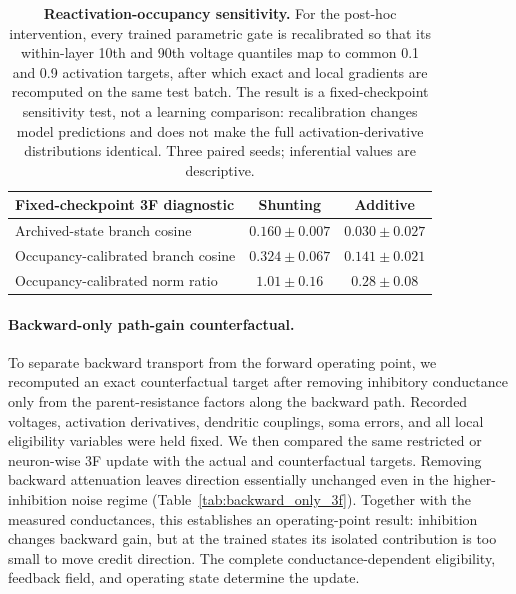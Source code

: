     \begin{table}[htbp]
    \centering
    \small
    \begin{tabular}{@{}lcc@{}}
    \toprule
    \textbf{Fixed-checkpoint 3F diagnostic} & \textbf{Shunting} & \textbf{Additive} \\
    \midrule
    Archived-state branch cosine & $0.160\pm0.007$ & $0.030\pm0.027$ \\
    Occupancy-calibrated branch cosine & $0.324\pm0.067$ & $0.141\pm0.021$ \\
    Occupancy-calibrated norm ratio & $1.01\pm0.16$ & $0.28\pm0.08$ \\
    \bottomrule
    \end{tabular}
    \caption{\textbf{Reactivation-occupancy sensitivity.} For the post-hoc intervention, every trained parametric gate is recalibrated so that its within-layer 10th and 90th voltage quantiles map to common 0.1 and 0.9 activation targets, after which exact and local gradients are recomputed on the same test batch. The result is a fixed-checkpoint sensitivity test, not a learning comparison: recalibration changes model predictions and does not make the full activation-derivative distributions identical. Three paired seeds; inferential values are descriptive.}
    \label{tab:occupancy_matched_3f}
    \end{table}

    \paragraph{Backward-only path-gain counterfactual.}
    To separate backward transport from the forward operating point, we recomputed an exact counterfactual target after removing inhibitory conductance only from the parent-resistance factors along the backward path. Recorded voltages, activation derivatives, dendritic couplings, soma errors, and all local eligibility variables were held fixed. We then compared the same restricted or neuron-wise 3F update with the actual and counterfactual targets. Removing backward attenuation leaves direction essentially unchanged even in the higher-inhibition noise regime (Table~\ref{tab:backward_only_3f}). Together with the measured conductances, this establishes an operating-point result: inhibition changes backward gain, but at the trained states its isolated contribution is too small to move credit direction. The complete conductance-dependent eligibility, feedback field, and operating state determine the update.

